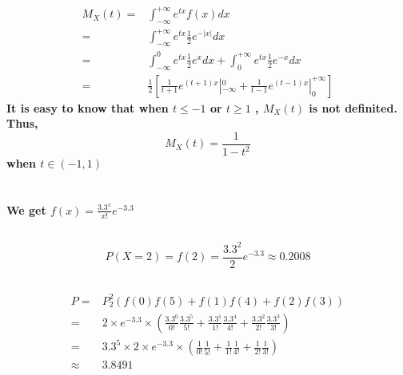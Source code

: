 \documentclass{article}
\begin{document}
        \paragraph{
            \begin{equation*}
                \begin{split}
                    M_X(t)=&\int_{-\infty}^{+\infty} e^{tx}f(x)dx\\
                        =&\int_{-\infty}^{+\infty} e^{tx}\frac{1}{2}e^{-|x|}dx\\
                        =&\int_{-\infty}^0 e^{tx}\frac{1}{2}e^{x}dx+\int_{0}^{+\infty} e^{tx}\frac{1}{2}e^{-x}dx\\
                        =&\frac{1}{2}[\frac{1}{t+1}e^{(t+1)x}|_{-\infty}^0+\frac{1}{t-1}e^{(t-1)x}|_0^{+\infty}]
                \end{split}
            \end{equation*}
            It is easy to know that when $t\leq-1$ or $t\geq 1$ , $M_X(t)$ is not definited. Thus,$$M_X(t)=\frac{1}{1-t^2}$$ when $t\in (-1,1)$
        }

    \section{}
        \paragraph{
            We get 
            $f(x)=\frac{3.3^x}{x!}e^{-3.3}$
        }
        \subsection{}   
            \paragraph{
               $$P(X=2)=f(2)=\frac{3.3^2}{2}e^{-3.3}\approx 0.2008$$
            }
        \subsection{}
            \paragraph{
                \begin{equation*}
                    \begin{split}
                        P=&P_2^2(f(0)f(5)+f(1)f(4)+f(2)f(3))\\
                            =&2\times e^{-3.3}\times(\frac{3.3^0}{0!}\frac{3.3^5}{5!}+\frac{3.3^1}{1!}\frac{3.3^4}{4!}+\frac{3.3^2}{2!}\frac{3.3^3}{3!})\\
                            =&3.3^5\times 2 \times e^{-3.3}\times(\frac{1}{0!}\frac{1}{5!}+\frac{1}{1!}\frac{1}{4!}+\frac{1}{2!}\frac{1}{3!})\\
                            \approx& 3.8491
                    \end{split}
                \end{equation*}
            }
\end{document}
